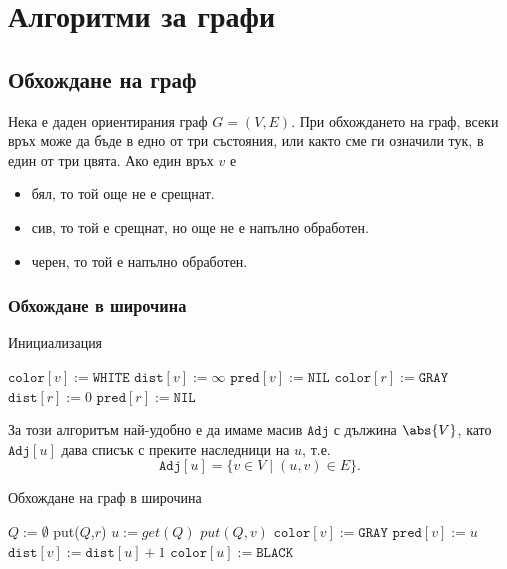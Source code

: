 \chapter {Алгоритми за графи}

\section{Обхождане на граф}

Нека е даден ориентирания граф $G = (V,E)$.
При обхождането на граф, всеки връх може да бъде в едно от три състояния, или както сме ги означили тук, в един от три цвята.
Ако един връх $v$ е
\begin{itemize}
\item 
  бял, то той още не е срещнат.
\item
  сив, то той е срещнат, но още не е напълно обработен.
\item
  черен, то той е напълно обработен.
\end{itemize}


\subsection{Обхождане в широчина}


\begin{algorithm}
  \caption{Инициализация}
  \label{alg:bfs-init}
  \begin{algorithmic}[1]
    \State $\texttt{color}[v] := \texttt{WHITE}$
    \State $\texttt{dist}[v] := \infty$
    \State $\texttt{pred}[v] := \texttt{NIL}$
    \EndFor
    \State $\texttt{color}[r]:= \texttt{GRAY}$
    \State $\texttt{dist}[r]:= 0$
    \State $\texttt{pred}[r]:= \texttt{NIL}$
    \EndProcedure
  \end{algorithmic}
\end{algorithm}

За този алгоритъм най-удобно е да имаме масив $\texttt{Adj}$ с дължина $\abs{V}$,
като $\texttt{Adj}[u]$ дава списък с преките наследници на $u$, т.е.
\[\texttt{Adj}[u] = \{v \in V \mid (u,v) \in E\}.\]

\begin{algorithm}[H]
  \caption{Обхождане на граф в широчина}
  \label{alg:bfs}
  \begin{algorithmic}[1]
    \State {}
    \State $Q := \emptyset$
    \State put($Q$,$r$)
    \State $u := get(Q)$
    \State $put(Q,v)$
    \State $\texttt{color}[v] := \texttt{GRAY}$
    \State $\texttt{pred}[v] := u$
    \State $\texttt{dist}[v] := \texttt{dist}[u] + 1$
    \EndIf
    \EndFor
    \State $\texttt{color}[u] := \texttt{BLACK}$
    \EndWhile
    \EndProcedure
  \end{algorithmic}
\end{algorithm}

